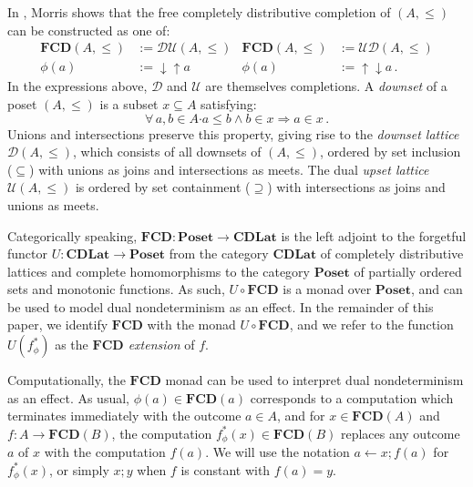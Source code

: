 \documentclass[sigplan,screen]{acmart}
\newcommand{\bdot}{\boldsymbol{\cdot}}
\begin{document}
In \cite{augtyp}, Morris shows that
the free completely distributive completion of $(A, \le)$
can be constructed as one of:
\begin{align*}
  \mathbf{FCD}(A, {\le}) &:= \mathcal{D} \mathcal{U}(A, {\le}) &
  \mathbf{FCD}(A, {\le}) &:= \mathcal{U} \mathcal{D}(A, {\le}) \\
  \phi(a) &:= {\downarrow}{\uparrow} a &
  \phi(a) &:= {\uparrow}{\downarrow} a \,.
\end{align*}
In the expressions above,
$\mathcal{D}$ and $\mathcal{U}$
are themselves completions.
A \emph{downset} of a poset $(A, {\le})$
is a subset $x \subseteq A$ satisfying:
\[
  \forall \, a, b \in A \bdot
          a \le b \wedge b \in x \Rightarrow a \in x \,.
\]
Unions and intersections preserve this property,
giving rise to the \emph{downset lattice} $\mathcal{D}(A, {\le})$,
which consists of all downsets of $(A, {\le})$,
ordered by set inclusion (${\subseteq}$) with
unions as joins and intersections as meets.
The dual \emph{upset lattice} $\mathcal{U}(A, {\le})$
is ordered by set containment (${\supseteq}$) with
intersections as joins and unions as meets.

Categorically speaking,
$\mathbf{FCD} : \mathbf{Poset} \rightarrow \mathbf{CDLat}$
is the left adjoint to the forgetful functor
$U : \mathbf{CDLat} \rightarrow \mathbf{Poset}$
from the category $\mathbf{CDLat}$
of completely distributive lattices and complete homomorphisms
to the category $\mathbf{Poset}$
of partially ordered sets and monotonic functions.
As such, $U \! \circ \mathbf{FCD}$ is a monad over $\mathbf{Poset}$,
and can be used to model dual nondeterminism
as an effect.
In the remainder of this paper,
we identify $\mathbf{FCD}$ with
the monad $U \! \circ \mathbf{FCD}$,
and we refer to the function
$U(f_\phi^*)$ as the \emph{$\mathbf{FCD}$ extension} of $f$.

Computationally,
the $\mathbf{FCD}$ monad can be used to interpret
dual nondeterminism as an effect.
As usual,
$\phi(a) \in \mathbf{FCD}(a)$
corresponds to a computation which
terminates immediately with the outcome $a \in A$,
and for $x \in \mathbf{FCD}(A)$
and $f : A \rightarrow \mathbf{FCD}(B)$,
the computation $f_\phi^*(x) \in \mathbf{FCD}(B)$
replaces any outcome $a$ of $x$ with the computation $f(a)$.
We will use the notation
$a \leftarrow x ; f(a)$ for $f^*_\phi(x)$,
or simply $x ; y$ when $f$ is constant with $f(a) = y$.
\end{document}

